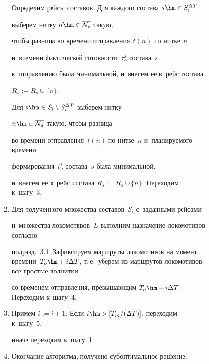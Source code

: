 \begin{multicols}{2}
\begin{figure}[b]
\begin{enumerate}[1.]
        Определим рейсы составов. Для каждого состава $s \hm\in S_i^{\Delta T}$ 


        выберем нитку $n \hm\in \overline{\mathcal N_s}$ такую,


        чтобы разница во времени отправления~$t(n)$ по нитке~$n$ 


        и~времени фактической готовности~$\tau_o^s$ состава~$s$


        к~отправлению была минимальной, и~внесем ее в~рейс состава 


        $R_s := R_s \cup \{n\}$.


        Для $s \hm\in S_i \setminus S_i^{\Delta T}$ выберем нитку 


        $n \hm\in \overline{\mathcal N_s}$ такую, чтобы разница


        во времени отправления~$t(n)$ по нитке~$n$ и~планируемого времени 


        формирования~$t_o^s$  состава~$s$ была минимальной,


        и~внесем ее в~рейс состава $R_s := R_s \cup \{n\}$. Переходим к~шагу~3.





        \item


        Для полученного множества составов~$S_i$ с~заданными рейсами 


        и~множества локомотивов~$L$ выполним назначение локомотивов согласно


         подразд.~3.1. Зафиксируем маршруты локомотивов на момент времени~$T_o \hm+ 


         i\Delta T$, т.\,е.\ уберем из маршрутов локомотивов все простые поднитки


          со временем отправления, превышающим $T_o \hm+ i\Delta T$. Переходим к~шагу~4.





        \item


        Примем $i := i+1$. Если $i \hm> [T_m/({\Delta T})]$, переходим к~шагу~5, 


        иначе переходим к~шагу~1.





        \item


        Окончание алгоритма, получено субоптимальное решение.



\end{enumerate}
\end{figure}
\end{multicols}
